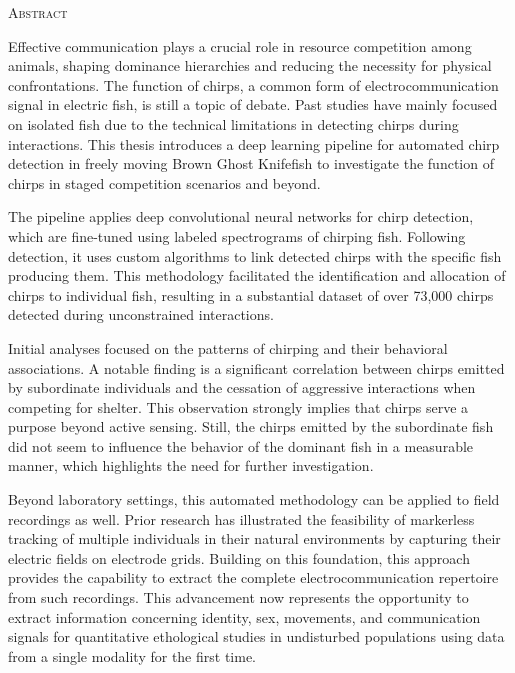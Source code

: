 \newpage

\begin{center}
  \textsc{Abstract}
\end{center}

\noindent

Effective communication plays a crucial role in resource competition among
animals, shaping dominance hierarchies and reducing the necessity for physical
confrontations. The function of chirps, a common form of
electrocommunication signal in electric fish, is still a topic of debate. Past
studies have mainly focused on isolated fish due to the technical limitations
in detecting chirps during interactions. This thesis introduces a deep learning
pipeline for automated chirp detection in freely moving Brown Ghost Knifefish
to investigate the function of chirps in staged competition scenarios and
beyond.

The pipeline applies deep convolutional neural networks for chirp detection,
which are fine-tuned using labeled spectrograms of chirping fish. Following
detection, it uses custom algorithms to link detected chirps with the specific
fish producing them. This methodology facilitated the identification and
allocation of chirps to individual fish, resulting in a substantial dataset of
over 73,000 chirps detected during unconstrained interactions.

Initial analyses focused on the patterns of chirping and their behavioral
associations. A notable finding is a significant correlation between chirps
emitted by subordinate individuals and the cessation of aggressive interactions
when competing for shelter. This observation strongly implies that chirps serve
a purpose beyond active sensing. Still, the chirps emitted by the subordinate
fish did not seem to influence the behavior of the dominant fish in a
measurable manner, which highlights the need for further investigation.

Beyond laboratory settings, this automated methodology can be applied to field
recordings as well. Prior research has illustrated the feasibility of
markerless tracking of multiple individuals in their natural environments by
capturing their electric fields on electrode grids. Building on this
foundation, this approach provides the capability to extract the complete
electrocommunication repertoire from such recordings. This advancement now
represents the opportunity to extract information concerning identity, sex,
movements, and communication signals for quantitative ethological studies in
undisturbed populations using data from a single modality for the first time.
